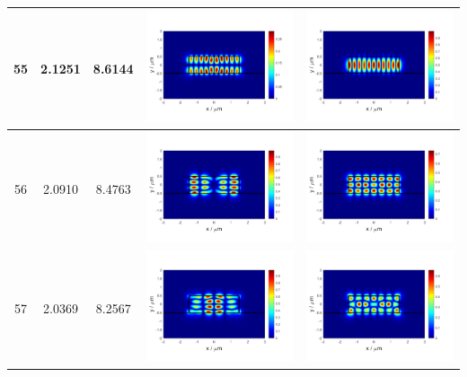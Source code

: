 \documentclass{assignment}
\begin{document}
\begin{sol}
\begin{itemize}
\begin{longtable}[c]{|c|c|c|c|c|}
            55 & 2.1251 & 8.6144 & \includegraphics[width=.3\columnwidth]{Assignment-2-mode-55-Ex.png} & \includegraphics[width=.3\columnwidth]{Assignment-2-mode-55-Ey.png} \\ \hline
            56 & 2.0910 & 8.4763 & \includegraphics[width=.3\columnwidth]{Assignment-2-mode-56-Ex.png} & \includegraphics[width=.3\columnwidth]{Assignment-2-mode-56-Ey.png} \\ \hline
            57 & 2.0369 & 8.2567 & \includegraphics[width=.3\columnwidth]{Assignment-2-mode-57-Ex.png} & \includegraphics[width=.3\columnwidth]{Assignment-2-mode-57-Ey.png} \\ \hline

\end{longtable}
\end{itemize}
\end{sol}
\end{document}
